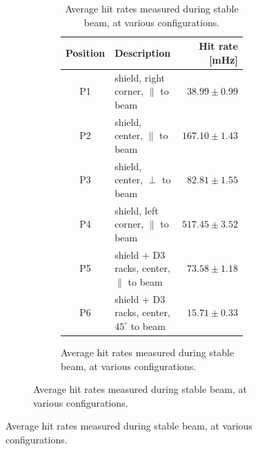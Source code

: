 \begin{figure}
{\begin{figure}
{\begin{figure}
{\begin{table}
\begin{center}
\begin{tabular}{c|l|r}
  Position & \hspace{0.9cm}Description & Hit rate [mHz] \\
  \hline \hline
   P1 & shield, right corner, $\parallel$ to beam & $ 38.99 \pm 0.99 $\\ \hline
   P2 & shield, center, $\parallel$ to beam& $ 167.10 \pm 1.43$ \\ \hline
   P3 & shield, center, $\perp$ to beam& $ 82.81 \pm 1.55 $ \\ \hline
   P4 & shield, left corner, $\parallel$ to beam& $ 517.45 \pm 3.52 $ \\ \hline
   P5 & shield + D3 racks, center, $\parallel$ to beam& $ 73.58 \pm 1.18 $ \\ \hline
   P6 & shield + D3 racks, center, $45^\circ$ to beam& $ 15.71 \pm 0.33 $ \\ \hline
\end{tabular}
\caption{\label{table:rate_stable_beam}
    Average hit rates measured during stable beam, at various configurations.
}
\end{center}
\end{table}

}
\end{figure}}
\end{figure}}
\end{figure}
